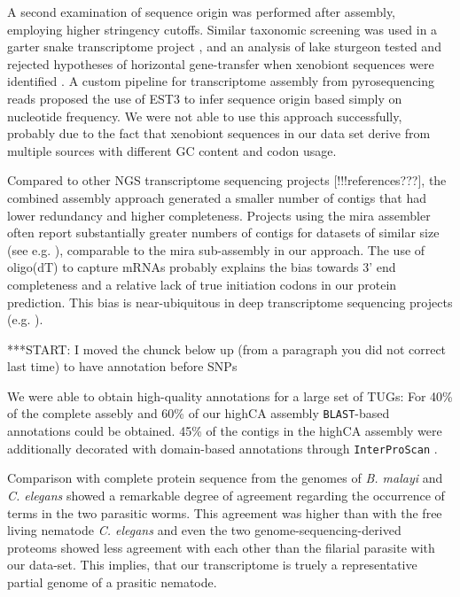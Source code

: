 \documentclass[10pt]{bmc_article}
\newenvironment{bmcformat}{\begin{raggedright}\baselineskip20pt\sloppy\setboolean{publ}{false}}{\end{raggedright}\baselineskip20pt\sloppy}
\begin{document}
\begin{bmcformat}
A second examination of sequence origin was performed after assembly,
employing higher stringency cutoffs.  Similar taxonomic screening was
used in a garter snake transcriptome project \cite{pmid21138572}, and
an analysis of lake sturgeon tested and rejected hypotheses of
horizontal gene-transfer when xenobiont sequences were identified
\cite{pmid20386959}. A custom pipeline for transcriptome assembly from
pyrosequencing reads \cite{pmid20034392} proposed the use of EST3
\cite{pmid17218127} to infer sequence origin based simply on
nucleotide frequency. We were not able to use this approach
successfully, probably due to the fact that xenobiont sequences in our
data set derive from multiple sources with different GC content and
codon usage.

Compared to other NGS transcriptome sequencing projects
[!!!references???], the combined assembly approach generated a smaller
number of contigs that had lower redundancy and higher
completeness. Projects using the mira assembler often report
substantially greater numbers of contigs for datasets of similar size
(see e.g. \cite{pmid21364769}), comparable to the mira sub-assembly in
our approach. The use of oligo(dT) to capture mRNAs probably explains
the bias towards 3' end completeness and a relative lack of true
initiation codons in our protein prediction. This bias is
near-ubiquitous in deep transcriptome sequencing projects
(e.g. \cite{pmid20331785}).

***START: I moved the chunck below up (from a paragraph you did not
correct last time) to have annotation before SNPs

We were able to obtain high-quality annotations for a large set of
TUGs: For 40\% of the complete assebly and 60\% of our highCA assembly
\texttt{BLAST}-based annotations could be obtained. 45\% of the
contigs in the highCA assembly were additionally decorated with
domain-based annotations through \texttt{InterProScan}
\cite{pmid11590104}.

Comparison with complete protein sequence from the genomes of
\textit{B. malayi} and \textit{C. elegans} showed a remarkable degree
of agreement regarding the occurrence of terms in the two parasitic
worms. This agreement was higher than with the free living nematode
\textit{C. elegans} and even the two genome-sequencing-derived
proteoms showed less agreement with each other than the filarial
parasite with our data-set. This implies, that our transcriptome is
truely a representative partial genome
\cite{parkinson_partigene--constructing_2004} of a prasitic nematode.


\end{bmcformat}
\end{document}

